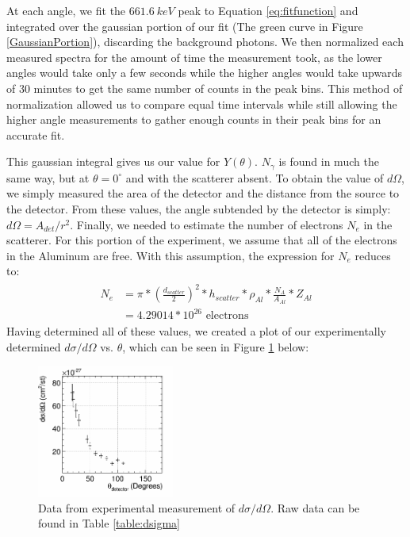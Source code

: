 \documentclass[%
 reprint,
 amsmath,amssymb,
 aps,
 pra,
]{revtex4-1}
\begin{document}
At each angle, we fit the $661.6~keV$ peak to Equation \ref{eq:fitfunction} and integrated over the gaussian portion of our fit (The green curve in Figure \ref{GaussianPortion}), discarding the background photons. We then normalized each measured spectra for the amount of time the measurement took, as the lower angles would take only a few seconds while the higher angles would take upwards of 30 minutes to get the same number of counts in the peak bins. This method of normalization allowed us to compare equal time intervals while still allowing the higher angle measurements to gather enough counts in their peak bins for an accurate fit.

This gaussian integral gives us our value for $Y(\theta)$. $N_\gamma$ is found in much the same way, but at $\theta = 0^\circ$ and with the scatterer absent. To obtain the value of $d\Omega$, we simply measured the area of the detector and the distance from the source to the detector. From these values, the angle subtended by the detector is simply: $d\Omega = A_{det}/r^2$. Finally, we needed to estimate the number of electrons $N_e$ in the scatterer. For this portion of the experiment, we assume that all of the electrons in the Aluminum are free. With this assumption, the expression for $N_e$ reduces to:
\begin{gather}
	\begin{split}
		N_e 		& = \pi*\left(\frac{d_{scatter}}{2}\right)^2*h_{scatter}*\rho_{Al}*\frac{N_A}{A_{Al}}*Z_{Al} \\
				& = 4.29014*10^{26} \text{ electrons}
	\end{split} \nonumber
\end{gather}
\noindent Having determined all of these values, we created a plot of our experimentally determined $d\sigma / d\Omega$ vs. $\theta$, which can be seen in Figure \ref{KN} below:

\begin{figure}[H]
	\centering
	\includegraphics[width=0.4\textwidth]{KNvsThompson_DataOnly.png}
	\caption{Data from experimental measurement of $d\sigma/d\Omega$. Raw data can be found in Table \ref{table:dsigma}}
	\label{KN}
\end{figure}
\end{document}
